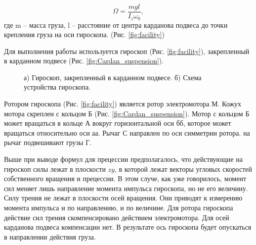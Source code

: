 \documentclass[a4paper,12pt]{article}
\begin{document}
\begin{equation}
	\Omega = \frac{mgl}{I_{z}\omega_{0}},
	\label{eq:teor_equation_omega}
\end{equation} 
где m -- масса груза, l -- расстояние от центра карданова подвеса до точки крепления груза на оси гироскопа. (Рис. \ref{fig:facility})

Для выполнения работы используется гироскоп (Рис. \ref{fig:facility}), закрепленный в карданном подвесе (Рис. \ref{fig:Cardan_suspension}).


\begin{figure}[ht!]  
	\vspace{-4ex} 
	\centering 
	\hspace{4ex}
	\caption{а) Гироскоп, закрепленный в карданном подвесе. б) Схема устройства гироскопа.}
\end{figure}

Ротором гироскопа (Рис. \ref{fig:facility}) является ротор электромотора М. Кожух мотора скреплен с кольцом Б (Рис. \ref{fig:Cardan_suspension}). Мотор с кольцом Б может вращаться в кольце А вокруг горизонтальной оси бб, которое может вращаться относительно оси аа. Рычаг С направлен по оси симметрии ротора. на рычаг подвешивают грузы Г.

Выше при выводе формул для прецессии предполагалось, что действующие на гироскоп силы лежат в плоскости $zy$, в которой лежат векторы угловых скоростей собственного вращения и прецессии. В этом случе, как уже говорилось, момент сил меняет лишь направление момента импульса гироскопа, но не его величину. Силу трения не лежат в плоскости осей вращения. Они приводят к измерению момента импульса и по направлению, и по величине. Для ротора гироскопа действие сил трения скомпенсировано действием электромотора. Для осей карданова подвеса компенсации нет. В результате ось гироскопа будет опускаться в направлении действия груза.
\end{document}

